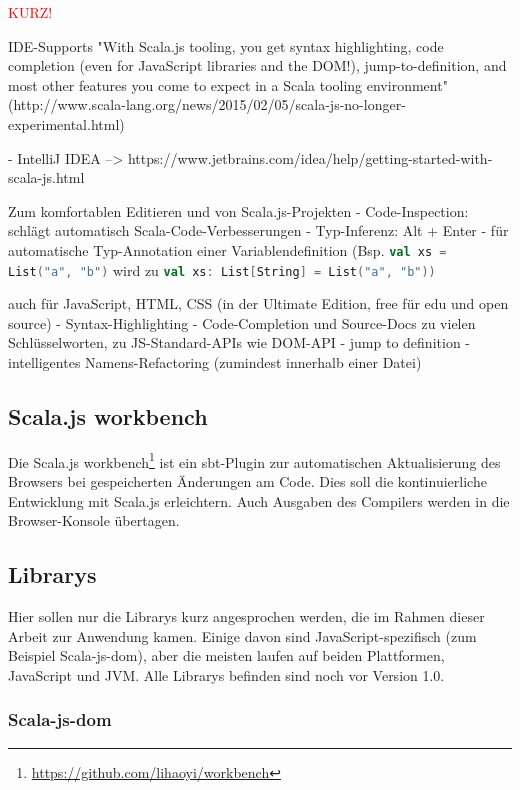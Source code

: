 \documentclass[a4paper, 12pt, hidelinks, listof=totoc, listoftables=totoc, bibliography=totoc]{scrreprt}
\newcommand{\scala}[1]{\lstinline[language=Scala, style=inline]|#1|}
\newcommand{\TODO}[1]{\textcolor{red}{#1}\newline}
\begin{document}
\TODO{KURZ!}

\ac{IDE}-Supports
  "With Scala.js tooling, you get syntax highlighting, code completion (even for JavaScript libraries and the \ac{DOM}!), jump-to-definition, and most other features you come to expect in a Scala tooling environment" (http://www.scala-lang.org/news/2015/02/05/scala-js-no-longer-experimental.html)

  - IntelliJ IDEA  -->  https://www.jetbrains.com/idea/help/getting-started-with-scala-js.html

    Zum komfortablen Editieren und von Scala.js-Projekten
    - Code-Inspection: schlägt automatisch Scala-Code-Verbesserungen
    - Typ-Inferenz: Alt + Enter - für automatische Typ-Annotation einer Variablendefinition (Bsp. \scala{val xs = List("a", "b")} wird zu \scala{val xs: List[String] = List("a", "b"))}

    auch für JavaScript, \ac{HTML}, CSS (in der Ultimate Edition, free für edu und open source)
      - Syntax-Highlighting
      - Code-Completion und Source-Docs zu vielen Schlüsselworten, zu JS-Standard-\ac{API}s wie \ac{DOM}-\ac{API}
      - jump to definition
      - intelligentes Namens-Refactoring (zumindest innerhalb einer Datei)





\subsection{Scala.js workbench}

Die Scala.js workbench\footnote{\url{https://github.com/lihaoyi/workbench}} ist ein sbt-Plugin zur automatischen Aktualisierung des Browsers 
bei gespeicherten Änderungen am Code. Dies soll die kontinuierliche Entwicklung mit Scala.js erleichtern. Auch Ausgaben des Compilers werden in die Browser-Konsole übertagen.

\subsection{Librarys}

Hier sollen nur die Librarys kurz angesprochen werden, die im Rahmen dieser Arbeit zur Anwendung kamen. Einige davon sind JavaScript-spezifisch (zum Beispiel Scala-js-dom), aber die meisten laufen auf beiden Plattformen, JavaScript und \ac{JVM}. Alle Librarys befinden sind noch vor Version 1.0.


\subsubsection{Scala-js-dom}
\end{document}
